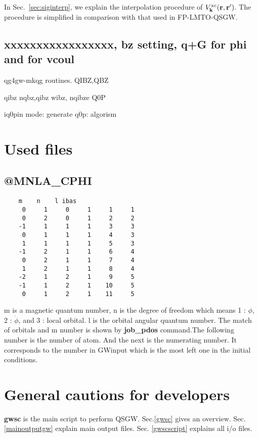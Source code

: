 \documentclass[a4paper,10pt,fleqn]{article}
\def\vxc{V^{\rm xc}}
\newcommand{\bfk}{{\bf k}}
\newcommand{\bfr}{{\bf r}}
\newcommand{\exe}[1]{{\bf #1}}
\begin{document}
In Sec.~\ref{sec:siginterp}, we explain the interpolation procedure of 
$\vxc_\bfk(\bfr,\bfr')$. The procedure is simplified in comparison with that used in FP-LMTO-QSGW.






\subsection{xxxxxxxxxxxxxxxxx, bz setting, q+G for phi and for vcoul}
qg4gw-mkqg routines.
QIBZ,QBZ 

qibz nqbz,qibz wibz, 
nqibze Q0P

iq0pin mode:
generate q0p: algorism


\newpage
\section{Used files} 
\subsection{@MNLA\_CPHI}
\label{sec:atmnla}
\begin{verbatim}
    m    n    l ibas
     0     1     0     1     1     1
     0     2     0     1     2     2
    -1     1     1     1     3     3
     0     1     1     1     4     3
     1     1     1     1     5     3
    -1     2     1     1     6     4
     0     2     1     1     7     4
     1     2     1     1     8     4
    -2     1     2     1     9     5
    -1     1     2     1    10     5
     0     1     2     1    11     5
\end{verbatim}
m is a magnetic quantum number, n is the degree of freedom which means 1 : $\phi$, 2 : $\dot{\phi}$, and 3 : local orbital. l is the orbital angular quantum number. The match of orbitals and m number is shown by {\bf job\_pdos} command.The following number is the number of atom. And the next is the numerating number. It corresponds to the number in GWinput which is the most left one in the initial conditions.




\section{General cautions for developers}
\exe{gwsc} is the main script to perform QSGW.
Sec.\ref{gwsc} gives an overview.
Sec.\ref{mainoutputgw} explain main output files.
Sec. \ref{gwscscript} explains all i/o files.
\end{document}
